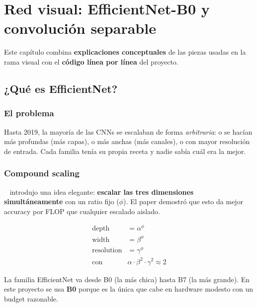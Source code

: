 \chapter{Red visual: EfficientNet-B0 y convolución separable}
\label{cap:visual-network}

Este capítulo combina \textbf{explicaciones conceptuales} de las
piezas usadas en la rama visual con el \textbf{código línea por
línea} del proyecto.

\section{¿Qué es EfficientNet?}

\subsection{El problema}

Hasta 2019, la mayoría de las CNNs se escalaban de forma
\emph{arbitraria}: o se hacían más profundas (más capas), o más
anchas (más canales), o con mayor resolución de entrada. Cada
familia tenía su propia receta y nadie sabía cuál era la mejor.

\subsection{Compound scaling}

\eff{}~\cite{tan2019efficientnet} introdujo una idea elegante:
\textbf{escalar las tres dimensiones simultáneamente} con un
ratio fijo ($\phi$). El paper demostró que esto da mejor
accuracy por FLOP que cualquier escalado aislado.

\begin{equation}
  \begin{aligned}
    \text{depth}   &= \alpha^{\phi} \\
    \text{width}   &= \beta^{\phi} \\
    \text{resolution} &= \gamma^{\phi} \\
    \text{con} \quad & \alpha \cdot \beta^2 \cdot \gamma^2 \approx 2
  \end{aligned}
  \label{eq:compound-scaling}
\end{equation}

\noindent La familia EfficientNet va desde B0 (la más chica) hasta
B7 (la más grande). En este proyecto se usa \textbf{B0} porque es
la única que cabe en hardware modesto con un budget razonable.

